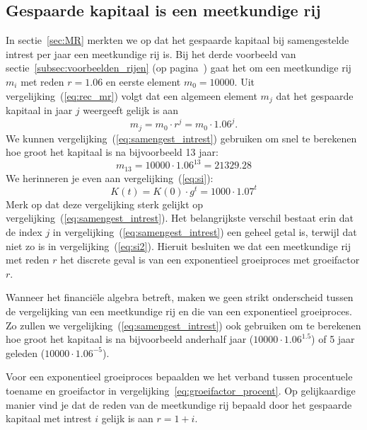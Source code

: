 \subsection{Gespaarde kapitaal is een meetkundige rij}
In sectie~\ref{sec:MR}  merkten we op dat het gespaarde kapitaal bij samengestelde intrest per jaar een meetkundige rij is. Bij het derde voorbeeld van sectie~\ref{subsec:voorbeelden_rijen} (op pagina~\pageref{subsec:voorbeelden_rijen}) gaat het om  een meetkundige rij $m_i$ met reden $r=\num{1.06}$ en eerste element $m_0=\num{10000}$. Uit vergelijking~(\ref{eq:rec_mr}) volgt dat een algemeen element $m_j$ dat het gespaarde kapitaal in jaar $j$ weergeeft gelijk is aan 
\begin{equation}
m_j=m_0\cdot r^j=m_0\cdot\num{1.06}^j.
\label{eq:samengest_intrest}
\end{equation}  
We kunnen vergelijking~(\ref{eq:samengest_intrest}) gebruiken om snel te berekenen hoe groot het kapitaal is na bijvoorbeeld 13 jaar:
\[
m_{13}=\num{10000}\cdot\num{1.06}^{13}=\num{21329,28}
\]
We herinneren je even aan vergelijking~(\ref{eq:si}):
\begin{equation}
     K(t)=K(0)\cdot g^{t}=1000\cdot \num{1.07}^{t}
    \label{eq:si2}
\end{equation}
Merk op dat deze vergelijking sterk gelijkt op vergelijking~(\ref{eq:samengest_intrest}). Het belangrijkste verschil bestaat erin dat de index $j$ in vergelijking~(\ref{eq:samengest_intrest}) een geheel getal is, terwijl dat niet zo is in vergelijking~(\ref{eq:si2}). Hieruit besluiten we dat een meetkundige rij met reden $r$ het discrete geval is van een exponentieel groeiproces met groeifactor $r$. 

Wanneer het financi\"ele algebra betreft, maken we geen strikt onderscheid tussen de vergelijking van een meetkundige rij en die van een exponentieel groeiproces. Zo zullen we vergelijking~(\ref{eq:samengest_intrest}) ook gebruiken om te berekenen hoe groot het kapitaal is na bijvoorbeeld anderhalf jaar ($\num{10000}\cdot \num{1.06}^{\num{1.5}}$) of 5 jaar geleden ($\num{10000}\cdot \num{1.06}^{-5}$). 

Voor een exponentieel groeiproces bepaalden we het verband tussen procentuele toename en groeifactor in vergelijking~\eqref{eq:groeifactor_procent}. Op gelijkaardige manier vind je dat de reden van de meetkundige rij bepaald door het gespaarde kapitaal met intrest $i$ gelijk is aan $r=1+i$. 

